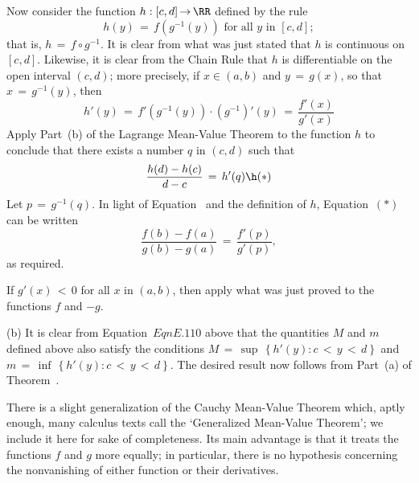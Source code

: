         Now consider the function $h:[c,d] \,{\rightarrow}\, {\RR}$ defined by the rule
        \begin{displaymath}
        h(y) \,=\, f(g^{-1}(y)) \mbox{ for all $y$ in $[c,d]$};
        \end{displaymath}
    that is, $h \,=\, f{\circ}g^{-1}$.
    It is clear from what was just stated that $h$ is continuous on $[c,d]$.
    Likewise, it is clear from the Chain Rule that $h$ is differentiable on the open interval $(c,d)$;
    more precisely, if $x{\in}(a,b)$ and $y \,=\, g(x)$, so that $x \,=\, g^{-1}(y)$, then
        \begin{equation}
        \label{EqnE.110A}
        h'(y) \,=\, f'(g^{-1}(y)){\cdot}(g^{-1})'(y) \,=\, \frac{f'(x)}{g'(x)}
        \end{equation}
        Apply Part~(b) of the Lagrange Mean-Value Theorem to the function $h$ to conclude that there exists a number $q$ in $(c,d)$ such that
        \begin{displaymath}
        \frac{h(d)-h(c)}{d-c} \,=\, h'(q) \h ({\ast})
        \end{displaymath}
    Let $p \,=\, g^{-1}(q)$. In light of Equation~ and the definition of $h$, Equation~$({\ast})$ can be written
        \begin{displaymath}
        \frac{f(b) - f(a)}{g(b) - g(a)} \,=\, \frac{f'(p)}{g'(p)},
        \end{displaymath}
    as required.

        If $g'(x)\,<\,0$ for all $x$ in $(a,b)$, then apply what was just proved to the functions $f$ and $-g$.

\V

        (b) It is clear from Equation~$EqnE.110$ above that the quantities $M$ and $m$ defined above also satisfy the conditions
    $M \,=\, {\sup}\,\left\{{\displaystyle h'(y): c\,<\,y\,<\,d}\right\}$ and $m \,=\, {\inf}\,\left\{{\displaystyle h'(y): c\,<\,y\,<\,d}\right\}$.
    The desired result now follows from Part~(a) of Theorem~. \Q


\VV

        There is a slight generalization of the Cauchy Mean-Value Theorem which, aptly enough,
    many calculus texts call the `Generalized Mean-Value Theorem'; we include it here for sake of completeness.
    Its main advantage is that it treats the functions $f$ and $g$ more equally; in particular,
    there is no hypothesis concerning the nonvanishing of either function or their derivatives.

